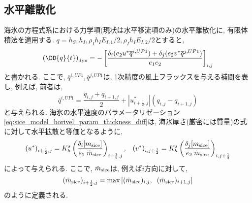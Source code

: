 \subsection{水平離散化}\label{sice_model_hspace_scheme}
海氷の方程式系における力学項(現状は水平移流項のみ)の水平離散化に, 有限体積法を適用する.   
$q=h_S, h_I, \rho_I h_I E_{I,1}/2, \rho_I h_I E_{I,2}/2$とすると, 
\begin{subequations}
\begin{gather}
 \left(\DD{q}{t}\right)_{\rm dyn}
 =  
   - \left[ \dfrac{  \delta_i (e_2 u^* \overline{q}^{i,UP1}) 
                   + \delta_j (e_2 v^* \overline{q}^{j,UP1})} {e_1 e_2} 
      \right]_{i,j}
\end{gather}
\end{subequations}
と書かれる. 
ここで, $\overline{q}^{i,UP1}, \overline{q}^{j,UP1}$は, 1次精度の風上フラックスを与える補間を表し,  
例えば, 前者は, 
\begin{equation*}
  \overline{q}^{i,UP1} 
  = \dfrac{q_{i,j} + q_{i+1,j}}{2} 
    + |u^*_{i+\frac{1}{2},j}| (q_{i,j} - q_{i+1,j})
\end{equation*}
と与えられる. 
海氷の水平速度のパラメータリゼーション\eqref{eq:sice_model_horivel_param_thickness_diff}は, 
海氷厚さ(厳密には質量)の式に対して水平拡散と等価となるように, 
\begin{align}
 (u^*)_{i+\frac{1}{2},j} 
 = K_h^s 
 \left(
  \dfrac{\delta_i [m_{\rm sice} ]}{e_1 \; \tilde{m}_{\rm sice}}
 \right)_{i+\frac{1}{2},j}, \;\;\;
 (v^*)_{i,j+\frac{1}{2}} 
 = K_h^s 
 \left(
  \dfrac{\delta_j [m_{\rm sice} ]}{e_2 \; \tilde{m}_{\rm sice}}
 \right)_{i,j+\frac{1}{2}}
\label{eq:sice_model_horivel_param_thickness_diff_fvm}
\end{align}
によって与えられる. 
ここで, $\tilde{m}_{\rm sice}$は, 例えば$i$方向に対して, 
$$
 (\tilde{m}_{\rm sice})_{i+\frac{1}{2},j} 
 = {\rm max}\left[(\tilde{m}_{\rm sice})_{i,j}, \;\;
                  (\tilde{m}_{\rm sice})_{i+1,j}
  \right]
$$
のように定義される. 

